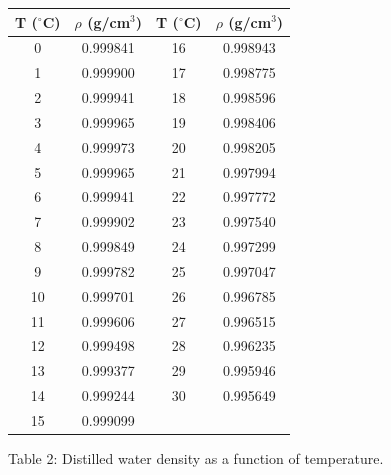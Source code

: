 \documentclass{article}
\begin{document}
\vspace{0.5cm}
\begin{center}
\begin{tabular}{|c|c||c|c|} \hline
T ($^{\circ}$C)  &  $\rho$ (g/cm$^{3}$) & T ($^{\circ}$C) & $\rho$
(g/cm$^{3}$) \\
\hline
0  &  0.999841  &  16  &  0.998943 \\
\hline
1  &  0.999900  &  17  &  0.998775  \\
\hline
2  &  0.999941  &  18  &  0.998596  \\
\hline
3  &  0.999965  &  19  &  0.998406  \\
\hline
4  &  0.999973  &  20  &  0.998205  \\
\hline
5  &  0.999965  &  21  &  0.997994  \\
\hline
6  &  0.999941  &  22  &  0.997772  \\
\hline
7  &  0.999902  &  23  &  0.997540  \\
\hline
8  &  0.999849  &  24  &  0.997299  \\
\hline
9  &  0.999782  &  25  &  0.997047  \\
\hline
10  &  0.999701  &  26  &  0.996785  \\
\hline
11  &  0.999606  &  27  &  0.996515  \\
\hline
12  &  0.999498  &  28  &  0.996235  \\
\hline
13  &  0.999377  &  29  &  0.995946  \\
\hline
14  &  0.999244  &  30  &  0.995649  \\
\hline
15  &  0.999099  &  &  \\
\hline
\end{tabular}

Table 2: Distilled water density as a function of temperature.
\end{center}

\nocite{Stull2015}





\end{document}

